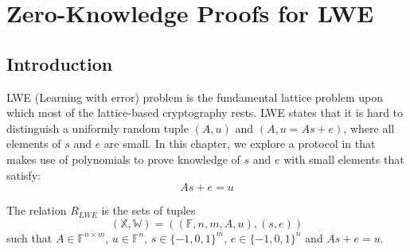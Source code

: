\chapter{Zero-Knowledge Proofs for LWE}

\section{Introduction}

LWE (Learning with error) problem is the fundamental lattice problem upon which most of the lattice-based cryptography rests. LWE states that it is hard to distinguish a uniformly random tuple $(A, u)$ and $(A, u = As+e)$, where all elements of $s$ and $e$ are small. In this chapter, we explore a protocol in \cite{lwe} that makes use of polynomials to prove knowledge of $s$ and $e$ with small elements that satisfy:
$$
    As + e = u
$$

\begin{definition}
The relation $R_{LWE}$ is the sets of tuples
$$
    (\mathbb{X}, \mathbb{W}) = ((\mathbb{F}, n, m, A, u), (s, e))
$$ 
such that $A \in \mathbb{F}^{n \times m}$, $u \in \mathbb{F}^{n}$, $s \in \{-1, 0, 1\}^{m}$, $e \in \{-1, 0, 1\}^{n}$ and $As + e = u$.
\end{definition}









